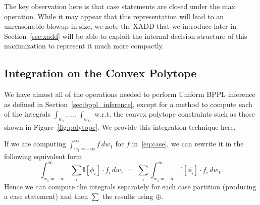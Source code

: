 \documentclass{article} %
\newcommand{\I}{\mathbb{I}}
\begin{document}
The key observation here is that case statements are closed under the
max operation.  While it may appear that this representation will lead
to an unreasonable blowup in size, we note the XADD that we introduce
later in Section~\ref{sec:xadd} will be able to exploit the internal
decision structure of this maximization to represent it much more
compactly.

\subsection{Integration on the Convex Polytope}

\label{sec:def_int}

We have almost all of the operations needed to perform Uniform BPPL
inference as defined in Section~\ref{sec:bppl_inference}, except for a
method to compute each of the integrals $\int_{w_1},\ldots,\int_{w_D}$
w.r.t. the convex polytope constraints such as those shown in
Figure~\ref{fig:polytope}.  We provide this integration technique
here.

If we are computing $\int_{w_1=-\infty}^{\infty} f \, dw_1$ for $f$
in~\eqref{eq:case}, we can rewrite it in the following equivalent form
\begin{equation}
\int_{w_1=-\infty}^{\infty} \sum_i \I[\phi_i] \cdot f_i \, dw_1 \; = \; \sum_i \int_{w_1=-\infty}^{\infty} \I[\phi_i] \cdot f_i \, dw_1 . \label{eq:int_decomp}
\end{equation}
Hence we can compute the integrals separately for each case partition
(producing a case statement) and then $\sum$ the results using
$\oplus$.
\end{document}
